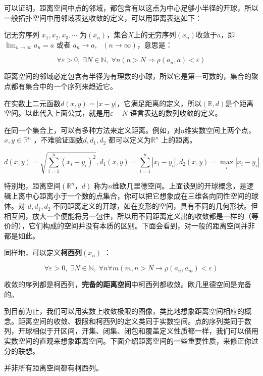 可以证明，距离空间中点的邻域，都包含有以这点为中心足够小半径的开球，所以一般拓扑空间中用邻域表达收敛的定义，可以用距离表达如下：

\kaishu
\setlength{\leftskip}{1em}

记无穷序列 $ x_1,x_2,x_3,\cdots $ 为$ (x_n) $，集合$ X $上的无穷序列$ (x_n) $收敛于$ a $，即 $ \lim_{n \rightarrow \infty} a_n $$= a $ 或者 $ a_n \rightarrow a , \mbox{ } (n \rightarrow \infty) $，意思是：

\[\forall \varepsilon > 0, \;\exists N \in \mathbb{N},\;\forall n ( n>N \Rightarrow \rho (a_n,a) < \varepsilon )\]

\songti
\setlength{\leftskip}{0em}

距离空间的邻域必定包含有半径为有理数的小球，所以它是第一可数的，集合的聚点都有集合中的一个序列来趋近它。

在实数上二元函数$ d(x,y)=|x-y| $，它满足距离的定义，所以$ (\mathbb{R}, d) $是个距离空间。以此代入上面公式，就是用$ \varepsilon - N $ 语言表达的数列收敛的定义。

在同一个集合上，可以有多种方法来定义距离。例如，对n维实数空间上两个点，$ x,y \in \mathbb{R}^n $
，不难验证函数$ d, d_1, d_2 $ 都可以定义为$ \mathbb{R}^n $ 上的距离。

\[d(x,y)=\sqrt{\sum_{i=1}^n (x_i  −y_i)^2}, d_1(x,y)=\sum_{i=1}^{n}|x_i − y_i|, d_2(x,y)=\max_i{|x_i−y_i|}\]

特别地，距离空间$ (\mathbb{R}^n，d) $ 称为$ n $维欧几里德空间。上面谈到的开球概念，是逻辑上离中心距离小于一个数的点集合，你可以把它想象成在三维各向同性空间的球体。对 $ d, d_1, d_2 $ 不同距离定义的开球，如在变形的空间，具有不同的几何形状。但相互间，放大一个便能将另一包住，所以用不同距离定义出的收敛都是一样的（等价的），它们构成的空间并没有本质的区别。下面会看到，对一般的距离空间并非都是如此。

同样地，可以定义\textbf{柯西列}$ (x_n) $ ：

\[\forall \varepsilon >0, \; \exists N\in \mathbb{N}, \;\forall n \forall m(m,n>N \rightarrow \rho(a_n,a_m)<\varepsilon)\]

收敛的序列都是柯西列，\textbf{完备的距离空间}中柯西列都收敛。欧几里德空间是完备的。

到目前为止，我们可以用实数上收敛极限的图像，类比地想象距离空间相应的概念。距离空间的收敛、极限和柯西列的定义类同于实数空间。点的序列类同于数列，开球相似于开区间，开集、闭集、闭包和覆盖定义性质都一样，我们可以借用实数空间的直观来想象距离空间。下面介绍距离空间的一些重要性质，来修正你过分的联想。

并非所有距离空间都有柯西列。

